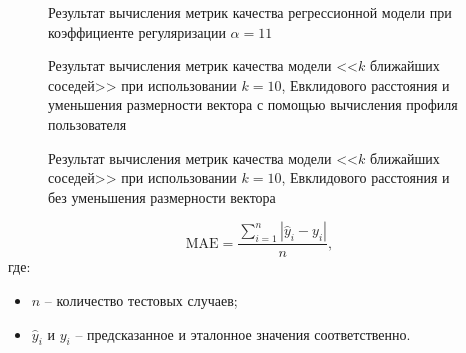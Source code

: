 \begin{figure}[htbp]
	\centering
	\caption{
	    Результат вычисления метрик качества регрессионной модели при коэффициенте регуляризации $\alpha=11$
	}
	\label{fig:reg_metric}
\end{figure}
\begin{figure}[htbp]
	\centering
	\caption{
	    Результат вычисления метрик качества модели <<$k$ ближайших соседей>> при использовании $k = 10$, Евклидового расстояния и уменьшения размерности вектора с помощью вычисления профиля пользователя
	}
	\label{fig:knn_metric_1}
\end{figure}
\begin{figure}[htbp]
	\centering
	\caption{
	    Результат вычисления метрик качества модели <<$k$ ближайших соседей>> при использовании $k = 10$, Евклидового расстояния и без уменьшения размерности вектора
	}
	\label{fig:knn_metric_2}
\end{figure}
\begin{equation}
    \label{eq:mae}
    \mathrm{MAE} = \frac{\sum\limits_{i=1}^{n} |\hat{y}_i - y_i|}{n},
\end{equation}
где:
\begin{itemize}
	\item $n$ -- количество тестовых случаев;
	\item $\hat{y}_i$ и  $y_i$ -- предсказанное и эталонное значения соответственно.
\end{itemize}

